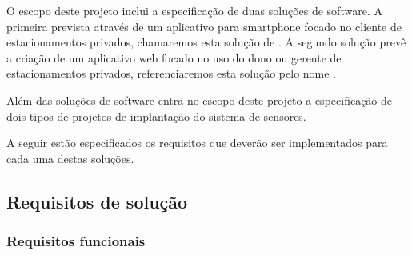 O escopo deste projeto inclui a especificação de duas soluções de software. A primeira prevista através de um aplicativo para smartphone focado no cliente de estacionamentos privados, chamaremos esta solução de \userMobileAppName. A segundo solução prevê a criação de um aplicativo web focado no uso do dono ou gerente de estacionamentos privados, referenciaremos esta solução pelo nome \parkingWebAppName.

Além das soluções de software entra no escopo deste projeto a especificação de dois tipos de projetos de implantação do sistema de sensores.

A seguir estão especificados os requisitos que deverão ser implementados para cada uma destas soluções.



\subsection{Requisitos de solução}

\subsubsection{Requisitos funcionais}


